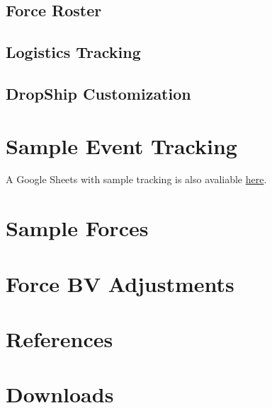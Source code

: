 \documentclass{article}
\newcommand{\mysectiontitle}{}
\newcommand{\newsection}[2]{\renewcommand{\mysectiontitle}{#2}\section{#1}}
\begin{document}
\subsection{Force Roster}



\subsection{Logistics Tracking}



\subsection{DropShip Customization}



\newpage

\newsection{Sample Event Tracking}{sample-tracking-event}
\label{sec:sample_tracking_event}

A Google Sheets with sample tracking is also avaliable \href{https://docs.google.com/spreadsheets/d/17bFS4qAbdIUJQ173NxxHDCCGLD_BG0LDdHGekpoF5M0/copy}{here}.



\newpage

\newsection{Sample Forces}{sample-forces}
\label{sec:sample_forces}



\newpage

\newsection{Force BV Adjustments}{bv-adjustments}
\label{sec:force_bv_adjustments}



\newpage

\newsection{References}{references}
\label{sec:references}



\newpage

\newsection{Downloads}{downloads}
\label{sec:downloads}



\newpage
\end{document}
